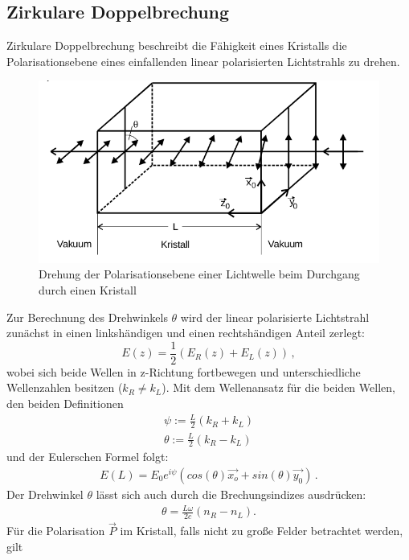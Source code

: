 \subsection{Zirkulare Doppelbrechung}
Zirkulare Doppelbrechung beschreibt die Fähigkeit eines Kristalls die Polarisationsebene eines einfallenden linear polarisierten Lichtstrahls zu drehen.
\begin{figure}
	  \centering
	  \includegraphics[width=1\textwidth]{pictures/drehung.png}
	         \caption{Drehung der Polarisationsebene einer Lichtwelle beim Durchgang durch einen Kristall \cite{Anleitung}
		 }
		   \label{fig:Bild1}
\end{figure}
Zur Berechnung des Drehwinkels $\theta$ wird der linear polarisierte Lichtstrahl zunächst in einen linkshändigen und einen rechtshändigen Anteil zerlegt:
\begin{equation*}
	E(z)= \frac{1}{2}(E_R(z)+E_L(z)) \, \mathrm{,}
\end{equation*}
wobei sich beide Wellen in z-Richtung fortbewegen und unterschiedliche Wellenzahlen besitzen ($k_R \neq k_L$).
Mit dem Wellenansatz für die beiden Wellen, den beiden Definitionen
\begin{align}\label{Winkel}
	\psi := \frac{L}{2} (k_R + k_L) \\\nonumber
	\theta := \frac{L}{2} (k_R - k_L)
\end{align}
und der Eulerschen Formel folgt:
\begin{align}
	E(L)=E_0 e^{i\psi}(cos(\theta ) \vec{x_o} + sin(\theta ) \vec{y_0} ) \, \mathrm{.}
\end{align}
Der Drehwinkel $\theta$ lässt sich auch durch die Brechungsindizes ausdrücken:
\begin{align*}
	\theta = \frac{L \omega}{2 c} (n_R - n_L) \mathrm{.}
\end{align*}
Für die Polarisation $\vec{P}$ im Kristall, falls nicht zu große Felder betrachtet werden, gilt

